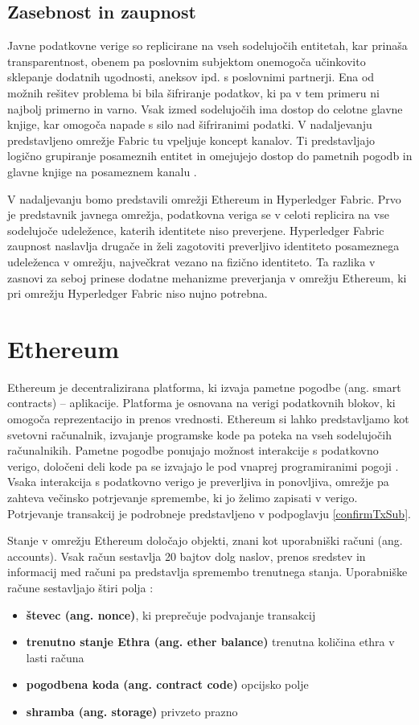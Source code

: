 \documentclass[a4paper, 12pt]{book}
\begin{document}
\subsection{Zasebnost in zaupnost}
Javne podatkovne verige so replicirane na vseh sodelujočih entitetah, kar prinaša transparentnost, obenem pa poslovnim subjektom onemogoča učinko\-vito sklepanje dodatnih ugodnosti, aneksov ipd. s poslovnimi partnerji.
Ena od možnih rešitev problema bi bila šifriranje podatkov, ki pa v tem primeru ni najbolj primerno in varno.
Vsak izmed sodelujočih ima dostop do celotne glavne knjige, kar omogoča napade s silo nad šifriranimi podatki.
V nadaljevanju predstavljeno omrežje Fabric tu vpeljuje koncept kanalov.
Ti predstavljajo logično grupiranje posameznih entitet in omejujejo dostop do pametnih pogodb in glavne knjige na posameznem kanalu \cite{hyperledgerDocs}.

V nadaljevanju bomo predstavili omrežji Ethereum in Hyperledger Fabric.
Prvo je predstavnik javnega omrežja, podatkovna veriga se v celoti replicira na vse sodelujoče udeležence, katerih identitete niso preverjene.
Hyperledger Fabric zaupnost naslavlja drugače in želi zagotoviti preverljivo identiteto posameznega udeleženca v omrežju, največkrat vezano na fizično identiteto.
Ta razlika v zasnovi za seboj prinese dodatne mehanizme preverjanja v omrežju Ethereum, ki pri omrežju Hyperledger Fabric niso nujno potrebna.

\section{Ethereum}
Ethereum je decentralizirana platforma, ki izvaja pametne pogodbe (ang. smart contracts) -- aplikacije.
Platforma je osnovana na verigi podatkovnih blokov, ki omogoča reprezentacijo in prenos vrednosti.
Ethereum si lahko predstavljamo kot svetovni računalnik, izvajanje programske kode pa poteka na vseh sodelujočih računalnikih.
Pametne pogodbe ponujajo možnost interakcije s podatkovno verigo, določeni deli kode pa se izvajajo le pod vnaprej programiranimi pogoji \cite{ethereumWhitepaper}.
Vsaka interakcija s podatkovno verigo je preverljiva in ponovljiva, omrežje pa zahteva večinsko potrjevanje spremembe, ki jo želimo zapisati v verigo. Potrjevanje transakcij je podrobneje predstavljeno v podpoglavju \ref{confirmTxSub}.

Stanje v omrežju Ethereum določajo objekti, znani kot uporabniški računi (ang. accounts).
Vsak račun sestavlja 20 bajtov dolg naslov, prenos sredstev in informacij med računi pa predstavlja spremembo trenutnega stanja.
Uporabniške račune sestavljajo štiri polja \cite{ethereumWhitepaper}:
\begin{itemize}
\item \textbf{števec (ang. nonce)}, ki preprečuje podvajanje transakcij
\item \textbf{trenutno stanje Ethra (ang. ether balance)} trenutna količina ethra v lasti računa
\item \textbf{pogodbena koda (ang. contract code)} opcijsko polje
\item \textbf{shramba (ang. storage)} privzeto prazno
\end{itemize}
\end{document}
